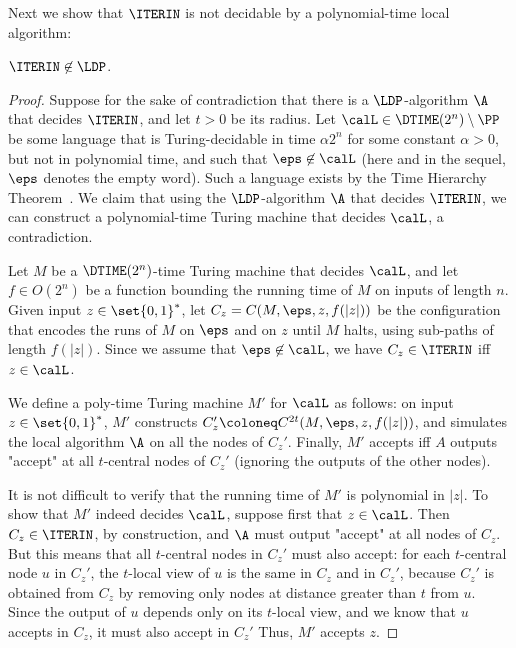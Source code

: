 Next we show that $\ITERIN$ is not decidable by a polynomial-time local algorithm:

\begin{claim}\label{claimITINLDP}
	$\ITERIN \not \in \LDP$.
\end{claim}
\begin{proof}
Suppose for the sake of contradiction that there is a $\LDP$-algorithm $\A$ that decides $\ITERIN$,
and let $t > 0 $ be its radius.
Let $\calL \in \DTIME(2^{n}) \setminus \PP$ be some language that is Turing-decidable
in time $\alpha 2^{n}$ for some constant $\alpha > 0$, but not in polynomial time,
and such that $\eps \not \in \calL$ (here and in the sequel, $\eps$ denotes the empty word).
Such a language exists by the Time Hierarchy Theorem~\cite{hartmanis1965computational}.
We claim that using the $\LDP$-algorithm $\A$ that decides $\ITERIN$, we can construct a polynomial-time Turing machine
that decides $\calL$, a contradiction.

Let $M$ be a $\DTIME(2^{n})$-time Turing machine that decides $\calL$,
and let $f \in O(2^n)$ be a function bounding the running time of $M$ on inputs of length $n$.
Given input $z \in \set{0,1}^*$,
let $C_z = C(M,\eps,z,f(|z|))$
be the configuration that encodes the runs of $M$ on $\eps$ and on $z$
until $M$ halts, using sub-paths of length $f(|z|)$.
Since we assume that $\eps \not \in \calL$,
we have $C_z \in \ITERIN$ iff $z \in \calL$.

We define a poly-time Turing machine $M'$ for $\calL$ as follows:
on input $z \in \set{0,1}^*$,
$M'$ constructs $C_z' \coloneq C^{2t}(M, \eps, z, f(|z|))$,
and simulates the local algorithm $\A$
on all the nodes of $C_z'$.
Finally, $M'$ accepts iff $A$ outputs "accept" at all $t$-central nodes of $C_z'$
(ignoring the outputs of the other nodes).

It is not difficult to verify that the running time of $M'$ is polynomial in $|z|$.
To show that $M'$ indeed decides $\calL$,
suppose first that $z \in \calL$.
Then $C_z \in \ITERIN$, by construction,
and $\A$ must output "accept" at all nodes of $C_z$.
But this means that all $t$-central nodes in $C_z'$ must also accept:
for each $t$-central node $u$ in $C_z'$,
the $t$-local view of $u$ is the same in $C_z$ and in $C_z'$,
because $C_z'$ is obtained from $C_z$ by removing only nodes at distance greater than $t$ from $u$.
Since the output of $u$ depends only on its $t$-local view,
and we know that $u$ accepts in $C_z$, it must also accept in $C_z'$
Thus, $M'$ accepts $z$.


\end{proof}
